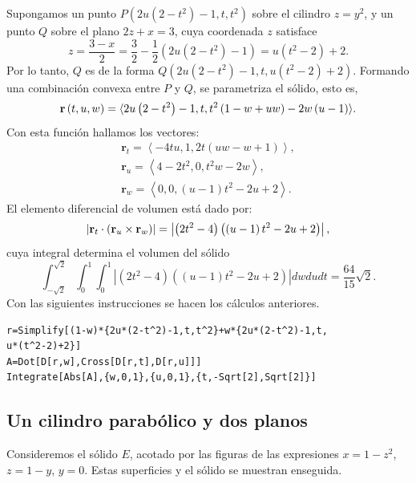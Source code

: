Supongamos un punto $P\left( 2u\left( 2-t^2\right) -1,t,t^2\right) $ sobre el cilindro $z=y^2$,
y un punto $Q$ sobre el plano $2z+x=3$, cuya coordenada $z$ satisface
\[
z = \frac{3 - x}{2} = \frac{3}{2} - \frac{1}{2} \left(2u \left(2 - t^2\right) - 1\right) = u\left(t^2 - 2\right) + 2.
\]
Por lo tanto, $Q$ es de la forma $Q( 2u\left( 2-t^2\right) -1,t,u\left( t^2-2\right)+2)$. Formando una combinación convexa entre $P$ y $Q$, se parametriza el sólido, esto es,
\begin{equation*}
{\bf r}\left( t,u,w\right) = \langle 2u\left( 2-t^2\right)-1,t,t^2\left( 1-w+uw\right) -2w\left( u-1\right) \rangle.
\end{equation*}
Con esta función hallamos los vectores:
\begin{gather*}
\mathbf{r}_{t} = \left\langle -4tu,1,2t\left( uw-w+1\right) \right\rangle, \\
\mathbf{r}_{u} = \left\langle 4-2t^2,0,t^2w-2w\right\rangle, \\
\mathbf{r}_{w} = \left\langle 0,0,\left( u-1\right) t^2-2u+2\right\rangle.
\end{gather*}
El elemento diferencial de volumen está dado por:
\[\left\vert {\bf r}_{t}\cdot \left( {\bf r}_{u}\times {\bf r}_{w}\right) \right\vert
=\left\vert \left( 2t^2-4\right) \left( \left( u-1\right)t^2-2u+2\right) \right\vert,\]
cuya integral determina el volumen del sólido
\[\int_{-\sqrt{2}}^{\sqrt{2}}\int_{0}^{1}\int_{0}^{1}\left\vert \left(2t^2-4\right) \left( \left( u-1\right) t^2-2u+2\right) \right\vert dwdudt= \frac{64}{15}\sqrt{2}.\]
Con las siguientes instrucciones se hacen los cálculos anteriores.

\begin{tcolorbox}[title=\bf Instrucción en \verb"Mathematica"]\begin{Verbatim}[formatcom=\letraverbatim]
r=Simplify[(1-w)*{2u*(2-t^2)-1,t,t^2}+w*{2u*(2-t^2)-1,t,
u*(t^2-2)+2}]
A=Dot[D[r,w],Cross[D[r,t],D[r,u]]]
Integrate[Abs[A],{w,0,1},{u,0,1},{t,-Sqrt[2],Sqrt[2]}]
\end{Verbatim}
\end{tcolorbox}

\subsection{Un cilindro parabólico y dos planos}

Consideremos el sólido $E$, acotado por las figuras de las expresiones
$x=1-z^2$, $z=1-y$, $y=0$. Estas superficies y el sólido se muestran enseguida.

